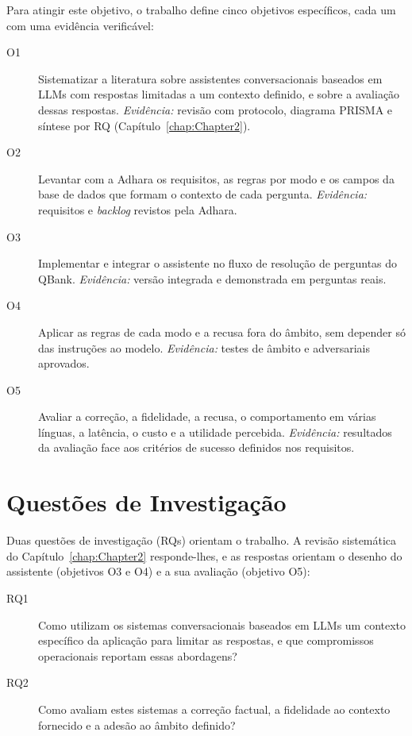 Para atingir este objetivo, o trabalho define cinco objetivos específicos, cada um com uma evidência verificável:
\begin{description}
    \item[O1] Sistematizar a literatura sobre assistentes conversacionais baseados em \glspl{LLM} com respostas limitadas a um contexto definido, e sobre a avaliação dessas respostas. \emph{Evidência:} revisão com protocolo, diagrama \gls{PRISMA} e síntese por \gls{RQ} (Capítulo~\ref{chap:Chapter2}).
    \item[O2] Levantar com a Adhara os requisitos, as regras por modo e os campos da base de dados que formam o contexto de cada pergunta. \emph{Evidência:} requisitos e \emph{backlog} revistos pela Adhara.
    \item[O3] Implementar e integrar o assistente no fluxo de resolução de perguntas do QBank. \emph{Evidência:} versão integrada e demonstrada em perguntas reais.
    \item[O4] Aplicar as regras de cada modo e a recusa fora do âmbito, sem depender só das instruções ao modelo. \emph{Evidência:} testes de âmbito e adversariais aprovados.
    \item[O5] Avaliar a correção, a fidelidade, a recusa, o comportamento em várias línguas, a latência, o custo e a utilidade percebida. \emph{Evidência:} resultados da avaliação face aos critérios de sucesso definidos nos requisitos.
\end{description}

\section{Questões de Investigação}
\label{sec:chap1_rqs}

Duas questões de investigação (\glspl{RQ}) orientam o trabalho. A revisão sistemática do Capítulo~\ref{chap:Chapter2} responde-lhes, e as respostas orientam o desenho do assistente (objetivos O3 e O4) e a sua avaliação (objetivo O5):
\begin{description}
    \item[RQ1] Como utilizam os sistemas conversacionais baseados em \glspl{LLM} um contexto específico da aplicação para limitar as respostas, e que compromissos operacionais reportam essas abordagens?
    \item[RQ2] Como avaliam estes sistemas a correção factual, a fidelidade ao contexto fornecido e a adesão ao âmbito definido?
\end{description}

